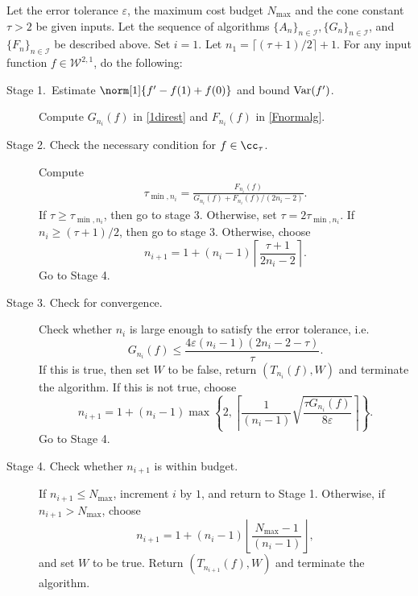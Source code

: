 \begin{algo} \label{multistageintegalgo}
Let the error tolerance $\varepsilon$, the maximum cost budget $N_{\text{max}}$ and the cone constant $\tau>2$ be given inputs. Let the sequence of algorithms $\{A_n\}_{n\in \mathcal{I}}, \{G_n\}_{n\in \mathcal{I}}$, and $\{F_n\}_{n\in \mathcal{I}}$ be described above. Set $i=1$. Let $n_1=\lceil(\tau+1)/2\rceil+1$. For any input function $f\in \mathcal{W}^{2,1}$, do the following:
\begin{description}
\item[Stage 1.\ Estimate {$\norm[1]{f'-f(1)+f(0)}$} and bound {$\operatorname{Var}(f')$}.] Compute $G_{n_i}(f)$ in \eqref{1direst} and $F_{n_i}(f)$ in \eqref{Fnormalg}.

\item[Stage 2. Check the necessary condition for $f \in \cc_{\tau}$.] Compute
    \begin{align*}
     \tau_{\min,n_i} =  \frac{F_{n_i}(f)}{G_{n_i}(f)+F_{n_i}(f)/(2n_i-2)}.
    \end{align*}
If $\tau \ge \tau_{\min,n_i}$, then go to stage 3.  Otherwise, set $\tau = 2\tau_{\min,n_i}$.  If $n_i \ge (\tau+1)/2$, then go to stage 3.  Otherwise, choose
$$
n_{i+1}=1+ (n_i-1)\left\lceil\frac{\tau+1}{2n_i-2}\right\rceil.
$$
Go to Stage 4.

\item[Stage 3. Check for convergence.] Check whether $n_i$ is large enough to satisfy the error tolerance, i.e.
    \begin{equation*}
     G_{n_i}(f) \le \frac{4\varepsilon(n_i-1)(2n_i-2 - \tau)}{\tau}.
    \end{equation*}
If this is true, then set $W$ to be false, return $(T_{n_i}(f),W)$ and terminate the algorithm.   If this is not true, choose
$$
n_{i+1}=1+ (n_i-1)\max\left\{2,\left\lceil\frac{1}{(n_i-1)}\sqrt{\frac{\tau G_{n_i}(f)}{8\varepsilon}}\right\rceil\right\}.
$$
Go to Stage 4.

\item[Stage 4. Check whether $n_{i+1}$ is within budget.] If $n_{i+1} \le N_{\max}$, increment $i$ by $1$, and return to Stage 1.  Otherwise, if $n_{i+1} > N_{\max}$, choose
$$
n_{i+1}=1+ (n_i-1)\left\lfloor\frac{N_{\max}-1}{(n_i-1)}\right\rfloor,
$$
and set $W$ to be true. Return $(T_{n_{i+1}}(f),W)$ and terminate the algorithm.
\end{description}
\end{algo}


